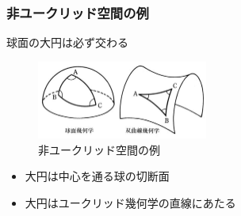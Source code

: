 \documentclass[unicode, 14pt, aspectratio=169]{beamer}
\begin{document}
\begin{frame}
  \frametitle{非ユークリッド空間の例}
  {\large 球面の大円は必ず交わる}
  \begin{figure}
    \includegraphics[width=0.5\textwidth]{images/non-euclid.png}
    \caption{非ユークリッド空間の例}
  \end{figure}
  \begin{itemize}
  \item 大円は中心を通る球の切断面
  \item 大円はユークリッド幾何学の直線にあたる
  \end{itemize}
\end{frame}
\end{document}

